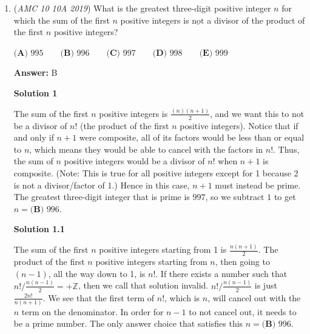 \begin{enumerate}
 Statement $3$ is false. A reflection across line $\ell$ will change the up-facing squares to down-facing squares and vice versa. 

 Finally, statement $4$ is also false because it will cause the diagonal lines extending from the squares to switch direction. 

 Thus, $\fbox {\textbf{(C)}  2}$ statements are true.

 Education, the Study of Everything

 


	\item (\textit{AMC 10 10A 2019}) What is the greatest three-digit positive integer $n$ for which the sum of the first $n$ positive integers is $\underline{\text{not}}$ a divisor of the product of the first $n$ positive integers?


 $\textbf{(A) } 995 \qquad\textbf{(B) } 996 \qquad\textbf{(C) } 997 \qquad\textbf{(D) } 998 \qquad\textbf{(E) } 999$

 \textbf{Answer: }B



\textbf{Solution 1}

The sum of the first $n$ positive integers is $\frac{(n)(n+1)}{2}$, and we want this to not be a divisor of $n!$ (the product of the first $n$ positive integers). Notice that if and only if $n+1$ were composite, all of its factors would be less than or equal to $n$, which means they would be able to cancel with the factors in $n!$. Thus, the sum of $n$ positive integers would be a divisor of $n!$ when $n+1$ is composite. (Note: This is true for all positive integers except for 1 because 2 is not a divisor/factor of 1.) Hence in this case, $n+1$ must instead be prime. The greatest three-digit integer that is prime is $997$, so we subtract $1$ to get $n=\boxed{\textbf{(B) } 996}$.

 



\textbf{Solution 1.1}

The sum of the first \( n \) positive integers starting from 1 is \( \frac{n(n+1)}{2} \). The product of the first \( n \) positive integers starting from \( n \), then going to \( (n-1) \), all the way down to 1, is \( n! \). If there exists a number such that \( n! / \frac{n(n-1)}{2} = +\mathbb{Z} \), then we call that solution invalid. \( n! / \frac{n(n-1)}{2} \) is just \( \frac{2n!}{n(n+1)} \). We see that the first term of \( n! \), which is \( n \), will cancel out with the \( n \) term on the denominator. In order for \( n-1 \) to not cancel out, it needs to be a prime number. The only answer choice that satisfies this $n=\boxed{\textbf{(B) } 996}$.


\end{enumerate}
